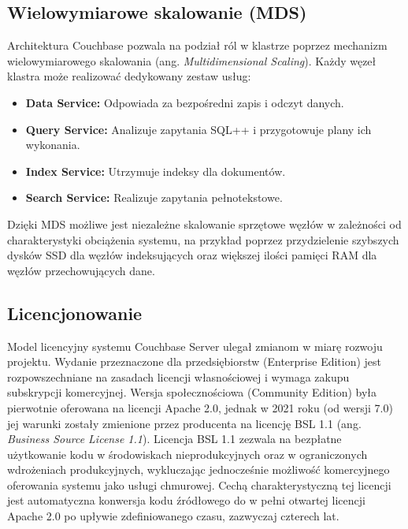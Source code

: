 \subsection{Wielowymiarowe skalowanie (MDS)}
Architektura Couchbase pozwala na podział ról w klastrze poprzez mechanizm wielowymiarowego skalowania (ang. \emph{Multidimensional Scaling}). Każdy węzeł klastra może realizować dedykowany zestaw usług:
\begin{itemize}
    \item \textbf{Data Service:} Odpowiada za bezpośredni zapis i odczyt danych.
    \item \textbf{Query Service:} Analizuje zapytania SQL++ i przygotowuje plany ich wykonania.
    \item \textbf{Index Service:} Utrzymuje indeksy dla dokumentów.
    \item \textbf{Search Service:} Realizuje zapytania pełnotekstowe.
\end{itemize}
Dzięki MDS możliwe jest niezależne skalowanie sprzętowe węzłów w zależności od charakterystyki obciążenia systemu, na przykład poprzez przydzielenie szybszych dysków SSD dla węzłów indeksujących oraz większej ilości pamięci RAM dla węzłów przechowujących dane.

\subsection{Licencjonowanie}
Model licencyjny systemu Couchbase Server ulegał zmianom w miarę rozwoju projektu. Wydanie przeznaczone dla przedsiębiorstw (Enterprise Edition) jest rozpowszechniane na zasadach licencji własnościowej i wymaga zakupu subskrypcji komercyjnej. Wersja społecznościowa (Community Edition) była pierwotnie oferowana na licencji Apache 2.0, jednak w 2021 roku (od wersji 7.0) jej warunki zostały zmienione przez producenta na licencję BSL 1.1 (ang. \emph{Business Source License 1.1}). Licencja BSL 1.1 zezwala na bezpłatne użytkowanie kodu w środowiskach nieprodukcyjnych oraz w ograniczonych wdrożeniach produkcyjnych, wykluczając jednocześnie możliwość komercyjnego oferowania systemu jako usługi chmurowej. Cechą charakterystyczną tej licencji jest automatyczna konwersja kodu źródłowego do w pełni otwartej licencji Apache 2.0 po upływie zdefiniowanego czasu, zazwyczaj czterech lat.

